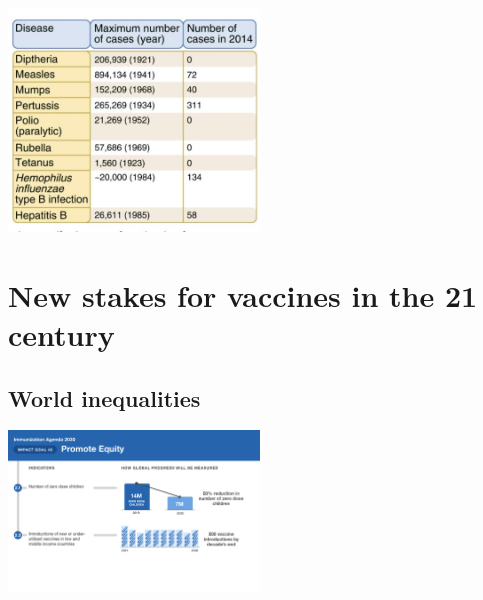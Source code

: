 \documentclass{article}
\begin{document}
        
        \begin{center}
            \includegraphics[width=0.5\textwidth]{imgs/NumberOfCases.JPG}
        \end{center}






        

    \section{New stakes for vaccines in the 21 century}

        \subsection{World inequalities}



        
        \begin{center}
            \includegraphics[width=0.5\textwidth]{imgs/IA2030_Scorecard_May23-3.png}
        \end{center}
\end{document}
